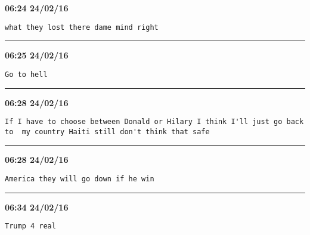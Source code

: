 \begin{adjustwidth}{0cm}{0cm}
\footnotesize \textbf{06:24 24/02/16}

\begin{lstlisting}[breaklines, breakatwhitespace, basicstyle=\small, frame=leftline]
what they lost there dame mind right
\end{lstlisting}
\end{adjustwidth}

\hrule%

\begin{adjustwidth}{0cm}{0cm}
\footnotesize \textbf{06:25 24/02/16}

\begin{lstlisting}[breaklines, breakatwhitespace, basicstyle=\small, frame=leftline]
Go to hell
\end{lstlisting}
\end{adjustwidth}

\hrule%

\begin{adjustwidth}{0cm}{0cm}
\footnotesize \textbf{06:28 24/02/16}

\begin{lstlisting}[breaklines, breakatwhitespace, basicstyle=\small, frame=leftline]
If I have to choose between Donald or Hilary I think I'll just go back to  my country Haiti still don't think that safe
\end{lstlisting}
\end{adjustwidth}

\hrule%

\begin{adjustwidth}{0cm}{0cm}
\footnotesize \textbf{06:28 24/02/16}

\begin{lstlisting}[breaklines, breakatwhitespace, basicstyle=\small, frame=leftline]
America they will go down if he win
\end{lstlisting}
\end{adjustwidth}

\hrule%

\begin{adjustwidth}{0cm}{0cm}
\footnotesize \textbf{06:34 24/02/16}

\begin{lstlisting}[breaklines, breakatwhitespace, basicstyle=\small, frame=leftline]
Trump 4 real
\end{lstlisting}
\end{adjustwidth}

